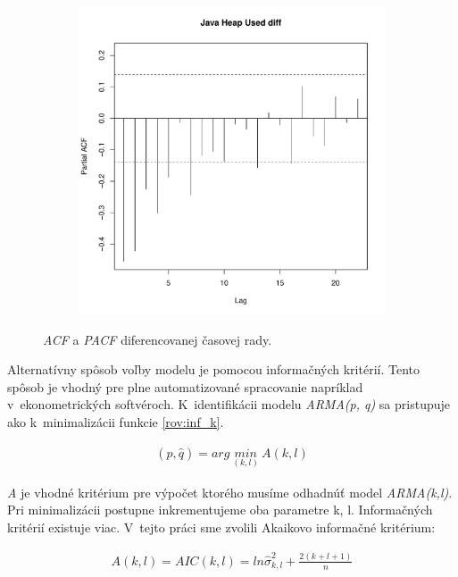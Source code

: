 \documentclass[12pt,a4paper,oneside,final]{article}
\theoremstyle{definition}
\theoremstyle{remark}
\numberwithin{equation}{section}
\begin{document}
\begin{figure}[H]
\begin{subfigure}[b]{0.45\textwidth}
        \includegraphics[width=1\linewidth]{images/heap_diff_pacf.pdf}
    \end{subfigure}
    \caption{\emph{ACF} a \emph{PACF} diferencovanej časovej rady.}
    \label{obr:heap_diff_acf_pacf}
\end{figure}

Alternatívny spôsob voľby modelu je pomocou informačných kritérií. Tento spôsob je
vhodný pre plne automatizované spracovanie \cite{cipra} napríklad v~ekonometrických 
softvéroch. K~identifikácii modelu \emph{ARMA(p, q)} sa pristupuje ako k~minimalizácii funkcie
\ref{rov:inf_k}.

\begin{eqnarray} \label{rov:inf_k}
    (\hat{p}, \hat{q}) =arg\ \underset{(k,l)}{min}\ A(k, l)
\end{eqnarray}

\emph{A} je vhodné kritérium pre výpočet ktorého musíme odhadnúť model
\emph{ARMA(k,l)}. Pri minimalizácii postupne inkrementujeme oba parametre k, l.
Informačných kritérií existuje viac. V~tejto práci sme zvolili Akaikovo informačné kritérium:

\begin{eqnarray} \label{rov:aic}
    A(k,l) = AIC(k,l) = ln\hat{\sigma}^{2}_{k,l} + \frac{2(k+l+1)}{n}
\end{eqnarray}
\end{document}
